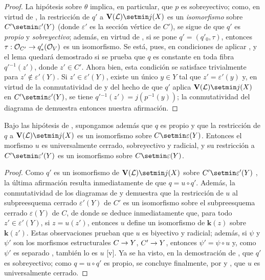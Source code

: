 \documentclass[oneside,10pt]{amsart}
\makeatletter
\newcommand{\ega@arrow}[2]{\mathchoice{#1}{#2}{#2}{#2}}
\renewcommand{\to}{\ega@arrow{\longrightarrow}{\rightarrow}}
\newcommand{\oldpage}[2][]{\marginnote{\normalfont\footnotesize\textbf{#1}~|~#2}\ignorespaces}
\let\EGAOriginalLabel\label
\renewcommand{\label}[1]{\phantomsection\EGAOriginalLabel{#1}}
\makeatother
\begin{document}
\begin{proof}
La hipótesis sobre $\theta$ implica, en particular, que $p$ es sobreyectivo;
como, en virtud de , la restricción de $q'$ a $\mathbf{V}(\mathcal{L})\setmin j(X)$ es un \emph{isomorfismo} sobre $C'\setmin\varepsilon'(Y)$ (donde $\varepsilon'$ es la sección vértice de $C'$), se sigue de  que $q'$ es \emph{propio} y \emph{sobreyectivo};
además, en virtud de , si se pone $q'=(q'_0,\tau)$, entonces $\tau:\mathcal{O}_{C'}\to q'_*(\mathcal{O}_V)$ es un isomorfismo.
Se está, pues, en condiciones de aplicar , y el lema quedará demostrado si se prueba que $q$ es constante en toda fibra $q'{}^{-1}(z')$, donde $z'\in C'$.
Ahora bien, esta condición se satisface trivialmente para $z'\notin\varepsilon'(Y)$.
Si $z'\in\varepsilon'(Y)$, existe un único $y\in Y$ tal que $z'=\varepsilon'(y)$ y, en virtud de la conmutatividad de  y del hecho de que $q'$ aplica $\mathbf{V}(\mathcal{L})\setmin j(X)$ en $C'\setmin\varepsilon'(Y)$, se tiene $q'{}^{-1}(z')=j(p^{-1}(y))$;
la conmutatividad del diagrama de  demuestra entonces nuestra afirmación.
\end{proof}

\begin{corollary}[8.11.6]
\label{II.8.11.6-fr}
Bajo las hipótesis de , supongamos además que $q$ es propio y que la restricción de $q$ a $\mathbf{V}(\mathcal{L})\setmin j(X)$ es un isomorfismo sobre $C\setmin\varepsilon(Y)$.
Entonces el morfismo $u$ es universalmente cerrado, sobreyectivo y radicial, y su restricción a $C'\setmin\varepsilon'(Y)$ es un isomorfismo sobre $C\setmin\varepsilon(Y)$.
\end{corollary}

\begin{proof}
Como $q'$ es un isomorfismo de $\mathbf{V}(\mathcal{L})\setmin j(X)$ sobre $C'\setmin\varepsilon'(Y)$ , la última afirmación resulta inmediatamente de que $q=u\circ q'$.
Además, la conmutatividad de los diagramas
\oldpage[II]{191}
de  y  demuestra que la restricción de $u$ al subpreesquema cerrado $\varepsilon'(Y)$ de $C'$ es un isomorfismo sobre el subpreesquema cerrado $\varepsilon(Y)$ de $C$, de donde se deduce inmediatamente que, para todo $z'\in\varepsilon'(Y)$, si $z=u(z')$, entonces $u$ define un isomorfismo de $\boldsymbol{k}(z)$ sobre $\boldsymbol{k}(z')$.
Estas observaciones prueban que $u$ es biyectivo y radicial;
además, si $\psi$ y $\psi'$ son los morfismos estructurales $C\to Y$, $C'\to Y$, entonces $\psi'=\psi\circ u$ y, como $\psi'$ es separado , también lo es $u$ [v].
Ya se ha visto, en la demostración de , que $q'$ es sobreyectivo;
como $q=u\circ q'$ es propio, se concluye finalmente, por  y , que $u$ es universalmente cerrado.
\end{proof}
\end{document}

